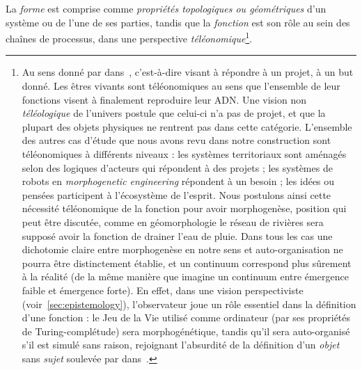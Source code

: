 {La \emph{forme} est comprise comme \emph{propriétés topologiques ou géométriques} d'un système ou de l'une de ses parties, tandis que la \emph{fonction} est son rôle au sein des chaînes de processus, dans une perspective \emph{téléonomique}\footnote{Au sens donné par  dans~\cite{monod1970hasard}, c'est-à-dire visant à répondre à un projet, à un but donné. Les êtres vivants sont téléonomiques au sens que l'ensemble de leur fonctions visent à finalement reproduire leur ADN. Une vision non \emph{téléologique} de l'univers postule que celui-ci n'a pas de projet, et que la plupart des objets physiques ne rentrent pas dans cette catégorie. L'ensemble des autres cas d'étude que nous avons revu dans notre construction sont téléonomiques à différents niveaux : les systèmes territoriaux sont aménagés selon des logiques d'acteurs qui répondent à des projets ; les systèmes de robots en \emph{morphogenetic engineering} répondent à un besoin ; les idées ou pensées participent à l'écosystème de l'esprit. Nous postulons ainsi cette nécessité téléonomique de la fonction pour avoir morphogenèse, position qui peut être discutée, comme en géomorphologie le réseau de rivières sera supposé avoir la fonction de drainer l'eau de pluie. Dans tous les cas une dichotomie claire entre morphogenèse en notre sens et auto-organisation ne pourra être distinctement établie, et un continuum correspond plus sûrement à la réalité (de la même manière que  imagine un continuum entre émergence faible et émergence forte). En effet, dans une vision perspectiviste (voir~\ref{sec:epistemology}), l'observateur joue un rôle essentiel dans la définition d'une fonction : le Jeu de la Vie utilisé comme ordinateur (par ses propriétés de Turing-complétude) sera morphogénétique, tandis qu'il sera auto-organisé s'il est simulé sans raison, rejoignant l'absurdité de la définition d'un \emph{objet} sans \emph{sujet} soulevée par  dans~\cite{morin1976methode}.}.
}


